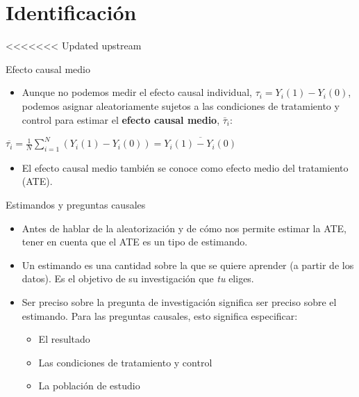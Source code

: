\documentclass[
  ignorenonframetext,
]{beamer}
\providecommand{\tightlist}{%
  \setlength{\itemsep}{0pt}\setlength{\parskip}{0pt}}
\begin{document}
\hypertarget{identificaciuxf3n}{%
\section{Identificación}\label{identificaciuxf3n}}

<<<<<<< Updated upstream
\begin{frame}{Efecto causal medio}
\protect\hypertarget{efecto-causal-medio}{}
\begin{itemize}
\tightlist
\item
  Aunque no podemos medir el efecto causal individual,
  \(\tau_i = Y_i(1)-Y_i(0)\), podemos asignar aleatoriamente sujetos a
  las condiciones de tratamiento y control para estimar el
  \textbf{efecto causal medio}, \(\bar{\tau}_i\):
\end{itemize}

\centering

\(\overline{\tau_i} = \frac{1}{N} \sum_{i=1}^N ( Y_i(1)-Y_i(0) ) = \overline{Y_i(1)-Y_i(0)}\)

\begin{itemize}
\tightlist
\item
  El efecto causal medio también se conoce como efecto medio del
  tratamiento (ATE).
\end{itemize}
\end{frame}

\begin{frame}{Estimandos y preguntas causales}
\protect\hypertarget{estimandos-y-preguntas-causales}{}
\begin{itemize}
\item
  Antes de hablar de la aleatorización y de cómo nos permite estimar la
  ATE, tener en cuenta que el ATE es un tipo de estimando.
\item
  Un estimando es una cantidad sobre la que se quiere aprender (a partir
  de los datos). Es el objetivo de su investigación que \emph{tu}
  eliges.
\item
  Ser preciso sobre la pregunta de investigación significa ser preciso
  sobre el estimando. Para las preguntas causales, esto significa
  especificar:

  \begin{itemize}
  \tightlist
  \item
    El resultado
  \item
    Las condiciones de tratamiento y control
  \item
    La población de estudio
  \end{itemize}
\end{itemize}
\end{frame}
\end{document}
